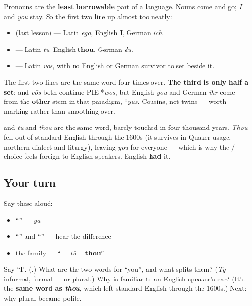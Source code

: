 \begin{cousinweb}
Pronouns are the \textbf{least borrowable} part of a language. Nouns come and go; \emph{I} and \emph{you} stay. So the first two line up almost too neatly:

\begin{itemize}
\raggedright
  \item \textbf{} (last lesson) — Latin \emph{ego}, English \textbf{I}, German \emph{ich}.
  \item \textbf{} — Latin \emph{tū}, English \textbf{thou}, German \emph{du}.
  \item \textbf{} — Latin \emph{vōs}, with no English or German survivor to set beside it.
\end{itemize}

The first two lines are the same word four times over. \textbf{The third is only half a set}: \emph{} and \emph{vōs} both continue PIE *\emph{wos}, but English \emph{you} and German \emph{ihr} come from the \textbf{other} stem in that paradigm, *\emph{yūs}. Cousins, not twins — worth marking rather than smoothing over.

\textbf{} and \emph{tū} and \emph{thou} are the same word, barely touched in four thousand years. \emph{Thou} fell out of standard English through the 1600s (it survives in Quaker usage, northern dialect and liturgy), leaving \emph{you} for everyone — which is why the / choice feels foreign to English speakers. English \textbf{had} it.
\end{cousinweb}

\subsection*{Your turn}
Say these aloud:

\begin{itemize}
\raggedright
  \item \textquotedblleft{}\textquotedblright{} — \emph{ya}
  \item \textquotedblleft{}\textquotedblright{} and \textquotedblleft{}\textquotedblright{} — hear the difference
  \item the family — \textquotedblleft{}\textbf{} … \emph{tū} … \textbf{thou}\textquotedblright{}
\end{itemize}

\begin{tcolorbox}[breakable,colback=teal!4,colframe=teal!35!black,title={Before you move on}]
Say \textquotedblleft{}I\textquotedblright{}. (\textbf{}.) What are the two words for \textquotedblleft{}you\textquotedblright{}, and what splits them? (\emph{Ty} informal, \textbf{} formal — or plural.) Why is \emph{} familiar to an English speaker's ear? (It's the \textbf{same word as \emph{thou}}, which left standard English through the 1600s.) Next: why plural \emph{} became polite.
\end{tcolorbox}
